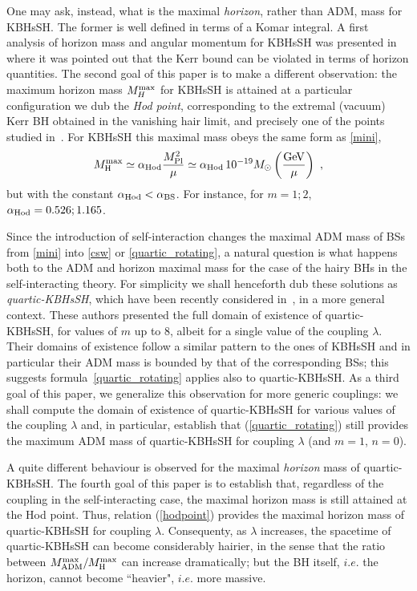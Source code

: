 One may ask, instead, what is the maximal \textit{horizon}, rather than ADM, mass for KBHsSH. The former is well defined in terms of a Komar integral. A first analysis of horizon mass and angular momentum for KBHsSH was presented in~\cite{Herdeiro:2015moa} where it was pointed out that the Kerr  bound can be violated in terms of horizon quantities. The second goal of this paper is to make a different observation: the maximum horizon mass $M^{\rm max}_H$ for KBHsSH is attained at a particular configuration we dub the \textit{Hod point}, corresponding to the extremal (vacuum) Kerr BH obtained in the vanishing hair limit, and precisely one of the points studied in~\cite{Hod:2012px}. For KBHsSH this maximal mass obeys the same form as \eqref{mini},
\begin{equation}
 M_{\rm H}^{\rm max}\simeq \alpha_{\rm Hod} \frac{M_{\rm Pl}^2}{\mu}\simeq \alpha_{\rm Hod} \, 10^{-19}M_\odot\left(\frac{\rm GeV}{\mu}\right)\ , 
\label{hodpoint}
\end{equation}
but with the constant $\alpha_{\rm Hod}<\alpha_{\rm BS}$. For instance, for $m=1;2$, $\alpha_{\rm Hod}=0.526; 1.165$. 
 
 
Since the introduction of self-interaction changes the maximal ADM mass of BSs from  \eqref{mini} into \eqref{csw} or \eqref{quartic_rotating}, a natural question is what happens both to the ADM and horizon maximal mass for the case of the hairy BHs in the self-interacting theory.  For simplicity we shall henceforth dub these solutions as \textit{quartic-KBHsSH}, which have been recently considered in~\cite{Kleihaus:2015iea},  in a more general context.  
These authors presented the full domain of existence of quartic-KBHsSH, for values of $m$ up to 8, albeit for a single value of the coupling $\lambda$. Their domains of existence follow a similar pattern to the ones of KBHsSH and in particular their ADM mass is bounded by that of the corresponding BSs; this suggests formula~\eqref{quartic_rotating} applies also to quartic-KBHsSH. As a third goal of this paper, we generalize this observation for more generic couplings: we shall compute the domain of existence of quartic-KBHsSH for various values of the coupling $\lambda$ and, in particular, establish that (\ref{quartic_rotating})  still provides the maximum ADM mass of quartic-KBHsSH for coupling $\lambda$ (and $m=1$, $n=0$). 
 
 A quite different behaviour is observed for the maximal \textit{horizon} mass of quartic-KBHsSH. The fourth goal of this paper is to establish that, regardless of the coupling in the self-interacting case, the maximal horizon mass is still attained at the Hod point. Thus, relation (\ref{hodpoint}) provides the maximal horizon mass of quartic-KBHsSH for coupling $\lambda$. Consequenty, as $\lambda$ increases, the spacetime of quartic-KBHsSH can become considerably hairier, in the sense that the ratio between $M_{\rm ADM}^{\rm max}/M_{\rm H}^{\rm max}$ can increase dramatically; but the BH itself, $i.e.$ the horizon, cannot become ``heavier", $i.e.$ more massive.
 

